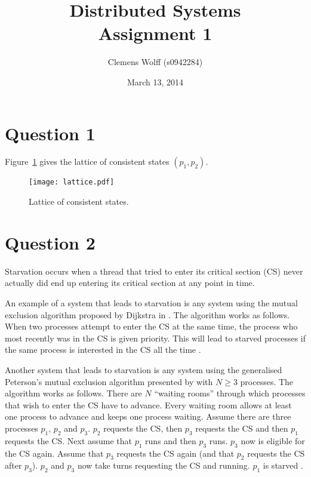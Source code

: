 \documentclass[a4paper,onecolumn,oneside]{article}
\title{Distributed Systems\\Assignment 1}
\author{Clemens Wolff (s0942284)}
\date{March 13, 2014}
\begin{document}
\maketitle

\section*{Question 1}

Figure~\ref{fig:lattice} gives the lattice of consistent states $(p_1,p_2)$.

\begin{figure}[h]
\texttt{[image: lattice.pdf]}
\caption{Lattice of consistent states.}
\label{fig:lattice}
\end{figure}

\section*{Question 2}

Starvation occurs when a thread that tried to enter its critical section (CS)
never actually did end up entering its critical section at any point in time.

An example of a system that leads to starvation is any system using the mutual
exclusion algorithm proposed by Dijkstra in \cite{dijkstra2001}.  The algorithm
works as follows.  When two processes attempt to enter the CS at the same time,
the process who most recently was in the CS is given priority.  This will lead
to starved processes if the same process is interested in the CS all the time
\cite[Theorem~5.1]{alagarsamy2003}.

Another system that leads to starvation is any system using the generalised
Peterson's mutual exclusion algorithm presented by \cite{hofri1990} with $N \geq
3$ processes.  The algorithm works as follows.  There are $N$ ``waiting rooms''
through which processes that wish to enter the CS have to advance.  Every
waiting room allows at least one process to advance and keeps one process
waiting. Assume there are three processes $p_1$, $p_2$ and $p_3$.  $p_2$
requests the CS, then $p_3$ requests the CS and then $p_1$ requests the CS\@.
Next assume that $p_1$ runs and then $p_3$ runs. $p_3$ now is eligible for the
CS again.  Assume that $p_3$ requests the CS again (and that $p_2$ requests the
CS after $p_3$).  $p_2$ and $p_3$ now take turns requesting the CS and running.
$p_1$ is starved \cite[Figure~1]{griffault2014}.
\end{document}
